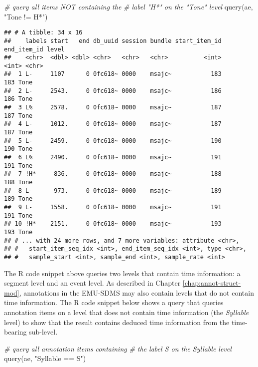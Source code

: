 \documentclass[
]{book}
\newenvironment{Shaded}{\begin{snugshade}}{\end{snugshade}}
\newcommand{\CommentTok}[1]{\textcolor[rgb]{0.56,0.35,0.01}{\textit{#1}}}
\newcommand{\FunctionTok}[1]{\textcolor[rgb]{0.00,0.00,0.00}{#1}}
\newcommand{\NormalTok}[1]{#1}
\newcommand{\StringTok}[1]{\textcolor[rgb]{0.31,0.60,0.02}{#1}}
\begin{document}
\begin{Shaded}
\begin{Highlighting}[]
\CommentTok{\# query all items NOT containing the}
\CommentTok{\# label "H*" on the "Tone" level}
\FunctionTok{query}\NormalTok{(ae, }\StringTok{"Tone != H*"}\NormalTok{)}
\end{Highlighting}
\end{Shaded}

\begin{verbatim}
## # A tibble: 34 x 16
##    labels start   end db_uuid session bundle start_item_id end_item_id level
##    <chr>  <dbl> <dbl> <chr>   <chr>   <chr>          <int>       <int> <chr>
##  1 L-     1107      0 0fc618~ 0000    msajc~           183         183 Tone 
##  2 L-     2543.     0 0fc618~ 0000    msajc~           186         186 Tone 
##  3 L%     2578.     0 0fc618~ 0000    msajc~           187         187 Tone 
##  4 L-     1012.     0 0fc618~ 0000    msajc~           187         187 Tone 
##  5 L-     2459.     0 0fc618~ 0000    msajc~           190         190 Tone 
##  6 L%     2490.     0 0fc618~ 0000    msajc~           191         191 Tone 
##  7 !H*     836.     0 0fc618~ 0000    msajc~           188         188 Tone 
##  8 L-      973.     0 0fc618~ 0000    msajc~           189         189 Tone 
##  9 L-     1558.     0 0fc618~ 0000    msajc~           191         191 Tone 
## 10 !H*    2151.     0 0fc618~ 0000    msajc~           193         193 Tone 
## # ... with 24 more rows, and 7 more variables: attribute <chr>,
## #   start_item_seq_idx <int>, end_item_seq_idx <int>, type <chr>,
## #   sample_start <int>, sample_end <int>, sample_rate <int>
\end{verbatim}

The R code snippet above queries two levels that contain time information: a segment level and an event level. As described in Chapter \ref{chap:annot-struct-mod}, annotations in the EMU-SDMS may also contain levels that do not contain time information. The R code snippet below shows a query that queries annotation items on a level that does not contain time information (the \emph{Syllable} level) to show that the result contains deduced time information from the time-bearing sub-level.

\begin{Shaded}
\begin{Highlighting}[]
\CommentTok{\# query all annotation items containing}
\CommentTok{\# the label S on the Syllable level}
\FunctionTok{query}\NormalTok{(ae, }\StringTok{"Syllable == S"}\NormalTok{)}
\end{Highlighting}
\end{Shaded}
\end{document}
